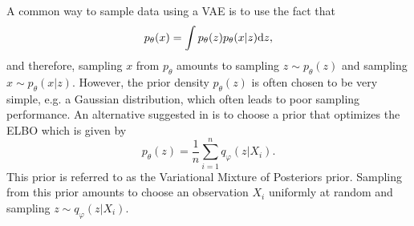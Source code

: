 \documentclass[english,graybox,envcountchap,envcountsame,sectrefs,shortlabels]{svmono}
\theoremstyle{style}
\newcommand{\eqsp}{}
\begin{document}
 A common way to sample data using a VAE is to use the fact that 
$$
p_\theta(x) = \int p_\theta(z)p_\theta(x|z)\rmd z\eqsp,
$$
and therefore, sampling $x$ from $p_\theta$ amounts to sampling $z\sim p_\theta(z)$ and sampling $x\sim p_\theta(x|z)$.  However, the prior density $p_\theta(z)$ is often chosen to be very simple, e.g. a Gaussian distribution, which often leads to poor sampling performance. An alternative suggested in \cite{tomczak2018vae} is to choose  a prior that optimizes the ELBO which is given by 
$$
p_\theta(z) = \frac{1}{n}\sum_{i=1}^nq_{\varphi}(z|X_i)\eqsp.
$$
This prior is referred to as the Variational Mixture of Posteriors prior. Sampling from this prior amounts to choose an observation $X_i$ uniformly at random and sampling $z\sim  q_{\varphi}(z|X_i)$.
\end{document}
